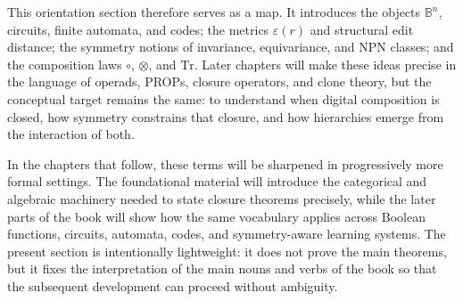 \documentclass[11pt]{article}
\begin{document}
This orientation section therefore serves as a map. It introduces the objects \(\mathbb{B}^n\), circuits, finite automata, and codes; the metrics \(\varepsilon(r)\) and structural edit distance; the symmetry notions of invariance, equivariance, and \(\mathrm{NPN}\) classes; and the composition laws \(\circ\), \(\otimes\), and \(\mathrm{Tr}\). Later chapters will make these ideas precise in the language of operads, PROPs, closure operators, and clone theory, but the conceptual target remains the same: to understand when digital composition is closed, how symmetry constrains that closure, and how hierarchies emerge from the interaction of both.

In the chapters that follow, these terms will be sharpened in progressively more formal settings. The foundational material will introduce the categorical and algebraic machinery needed to state closure theorems precisely, while the later parts of the book will show how the same vocabulary applies across Boolean functions, circuits, automata, codes, and symmetry-aware learning systems. The present section is intentionally lightweight: it does not prove the main theorems, but it fixes the interpretation of the main nouns and verbs of the book so that the subsequent development can proceed without ambiguity.
\end{document}
